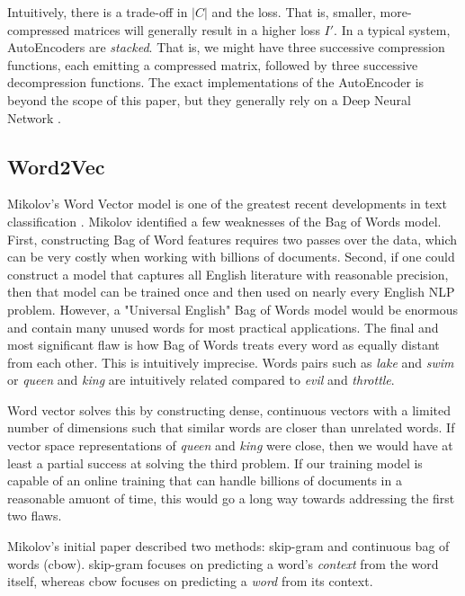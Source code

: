 \par{
Intuitively, there is a trade-off in $|C|$ and the loss. That is, smaller, more-compressed matrices will generally result in a higher loss $I'$. In a typical system, AutoEncoders are \textit{stacked}. That is, we might have three successive compression functions, each emitting a compressed matrix, followed by three successive decompression functions. The exact implementations of the AutoEncoder is beyond the scope of this paper, but they generally rely on a Deep Neural Network \cite{tensorflow}.
}

\subsection{Word2Vec}

\par{
Mikolov's Word Vector model is one of the greatest recent developments in text classification \cite{word2vec}. Mikolov identified a few weaknesses of the Bag of Words model. First, constructing Bag of Word features requires two passes over the data, which can be very costly when working with billions of documents. Second, if one could construct a model that captures all English literature with reasonable precision, then that model can be trained once and then used on nearly every English NLP problem. However, a "Universal English" Bag of Words model would be enormous and contain many unused words for most practical applications. The final and most significant flaw is how Bag of Words treats every word as equally distant from each other. This is intuitively imprecise. Words pairs such as \textit{lake} and \textit{swim} or \textit{queen} and \textit{king} are intuitively related compared to \textit{evil} and \textit{throttle}.
}

\par{
Word vector solves this by constructing dense, continuous vectors with a limited number of dimensions such that similar words are closer than unrelated words. If vector space representations of \textit{queen} and \textit{king} were close, then we would have at least a partial success at solving the third problem. If our training model is capable of an online training that can handle billions of documents in a reasonable amuont of time, this would go a long way towards addressing the first two flaws.
}

\par{
Mikolov's initial paper described two methods: \textsf{skip-gram} and \textsf{continuous bag of words (cbow)}. \textsf{skip-gram} focuses on predicting a word's \textit{context} from the word itself, whereas \textsf{cbow} focuses on predicting a \textit{word} from its context. 
}

